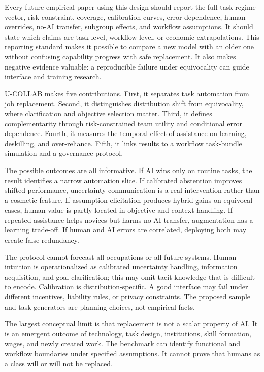 \documentclass[conference]{IEEEtran}
\begin{document}
Every future empirical paper using this design should report the full task-regime vector, risk constraint, coverage, calibration curves, error dependence, human overrides, no-AI transfer, subgroup effects, and workflow assumptions. It should state which claims are task-level, workflow-level, or economic extrapolations. This reporting standard makes it possible to compare a new model with an older one without confusing capability progress with safe replacement. It also makes negative evidence valuable: a reproducible failure under equivocality can guide interface and training research.

U-COLLAB makes five contributions. First, it separates task automation from job replacement. Second, it distinguishes distribution shift from equivocality, where clarification and objective selection matter. Third, it defines complementarity through risk-constrained team utility and conditional error dependence. Fourth, it measures the temporal effect of assistance on learning, deskilling, and over-reliance. Fifth, it links results to a workflow task-bundle simulation and a governance protocol.

The possible outcomes are all informative. If AI wins only on routine tasks, the result identifies a narrow automation slice. If calibrated abstention improves shifted performance, uncertainty communication is a real intervention rather than a cosmetic feature. If assumption elicitation produces hybrid gains on equivocal cases, human value is partly located in objective and context handling. If repeated assistance helps novices but harms no-AI transfer, augmentation has a learning trade-off. If human and AI errors are correlated, deploying both may create false redundancy.

The protocol cannot forecast all occupations or all future systems. Human intuition is operationalized as calibrated uncertainty handling, information acquisition, and goal clarification; this may omit tacit knowledge that is difficult to encode. Calibration is distribution-specific. A good interface may fail under different incentives, liability rules, or privacy constraints. The proposed sample and task generators are planning choices, not empirical facts.

The largest conceptual limit is that replacement is not a scalar property of AI. It is an emergent outcome of technology, task design, institutions, skill formation, wages, and newly created work. The benchmark can identify functional and workflow boundaries under specified assumptions. It cannot prove that humans as a class will or will not be replaced.
\end{document}
